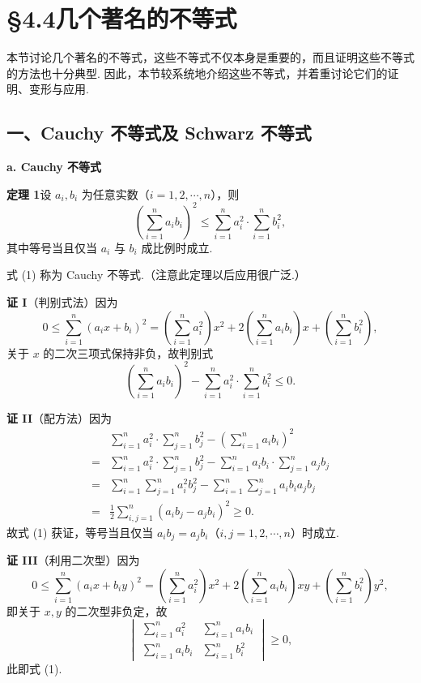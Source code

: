 \documentclass[UTF8, 12pt, fontset=fandol, oneside]{ctexart}
\begin{document}
\section*{§4.4\quad 几个著名的不等式}

本节讨论几个著名的不等式，这些不等式不仅本身是重要的，而且证明这些不等式的方法也十分典型. 因此，本节较系统地介绍这些不等式，并着重讨论它们的证明、变形与应用.

\subsection*{一、Cauchy 不等式及 Schwarz 不等式}

\noindent\textbf{a. Cauchy 不等式}

\noindent\textbf{定理 1}\quad 设 $a_i,b_i$ 为任意实数（$i=1,2,\cdots,n$），则
\[
\left(\sum_{i=1}^n a_i b_i\right)^2
\le \sum_{i=1}^n a_i^2\cdot \sum_{i=1}^n b_i^2, \tag{1}
\]
其中等号当且仅当 $a_i$ 与 $b_i$ 成比例时成立.

式 (1) 称为 Cauchy 不等式.（注意此定理以后应用很广泛.）

\noindent\textbf{证 I}\quad（判别式法）因为
\[
0\le \sum_{i=1}^n(a_i x+b_i)^2
=\left(\sum_{i=1}^n a_i^2\right)x^2
+2\left(\sum_{i=1}^n a_i b_i\right)x
+\left(\sum_{i=1}^n b_i^2\right),
\]
关于 $x$ 的二次三项式保持非负，故判别式
\[
\left(\sum_{i=1}^n a_i b_i\right)^2
-\sum_{i=1}^n a_i^2\cdot\sum_{i=1}^n b_i^2\le0.
\]

\noindent\textbf{证 II}\quad（配方法）因为
\[
\begin{aligned}
&\sum_{i=1}^n a_i^2\cdot\sum_{j=1}^n b_j^2
-\left(\sum_{i=1}^n a_i b_i\right)^2\\
={}&\sum_{i=1}^n a_i^2\cdot\sum_{j=1}^n b_j^2
-\sum_{i=1}^n a_i b_i\cdot\sum_{j=1}^n a_j b_j\\
={}&\sum_{i=1}^n\sum_{j=1}^n a_i^2b_j^2
-\sum_{i=1}^n\sum_{j=1}^n a_i b_i a_j b_j\\
={}&\frac12\sum_{i,j=1}^n(a_i b_j-a_j b_i)^2\ge0.
\end{aligned}
\]
故式 (1) 获证，等号当且仅当 $a_i b_j=a_j b_i$（$i,j=1,2,\cdots,n$）时成立.

\noindent\textbf{证 III}\quad（利用二次型）因为
\[
0\le\sum_{i=1}^n(a_i x+b_i y)^2
=\left(\sum_{i=1}^n a_i^2\right)x^2
+2\left(\sum_{i=1}^n a_i b_i\right)xy
+\left(\sum_{i=1}^n b_i^2\right)y^2,
\]
即关于 $x,y$ 的二次型非负定，故
\[
\begin{vmatrix}
\sum_{i=1}^n a_i^2&\sum_{i=1}^n a_i b_i\\
\sum_{i=1}^n a_i b_i&\sum_{i=1}^n b_i^2
\end{vmatrix}\ge0,
\]
此即式 (1).
\end{document}
